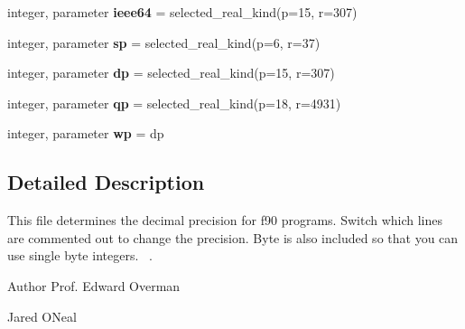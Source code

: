 \begin{DoxyCompactItemize}
integer, parameter {\bfseries ieee64} = selected\+\_\+real\+\_\+kind(p=15, r=307)
\item 
\hypertarget{namespaceset__precision_a13d80e8b80b6921e0a3c802a36f65864}{}\label{namespaceset__precision_a13d80e8b80b6921e0a3c802a36f65864} 
integer, parameter {\bfseries sp} = selected\+\_\+real\+\_\+kind(p=6, r=37)
\item 
\hypertarget{namespaceset__precision_a4f75e99c30368767fc579f7266cbe72c}{}\label{namespaceset__precision_a4f75e99c30368767fc579f7266cbe72c} 
integer, parameter {\bfseries dp} = selected\+\_\+real\+\_\+kind(p=15, r=307)
\item 
\hypertarget{namespaceset__precision_a44b548370c6da8498ea17dc80c7b3d28}{}\label{namespaceset__precision_a44b548370c6da8498ea17dc80c7b3d28} 
integer, parameter {\bfseries qp} = selected\+\_\+real\+\_\+kind(p=18, r=4931)
\item 
\hypertarget{namespaceset__precision_a4166cb4cc83c726719939d0fe242ed6f}{}\label{namespaceset__precision_a4166cb4cc83c726719939d0fe242ed6f} 
integer, parameter {\bfseries wp} = dp
\end{DoxyCompactItemize}


\subsection{Detailed Description}
This file determines the decimal precision for f90 programs. Switch which lines are commented out to change the precision. Byte is also included so that you can use single byte integers.~\newline
. 

\begin{DoxyAuthor}{Author}
Prof. Edward Overman 

Jared O\textquotesingle{}Neal 
\end{DoxyAuthor}
